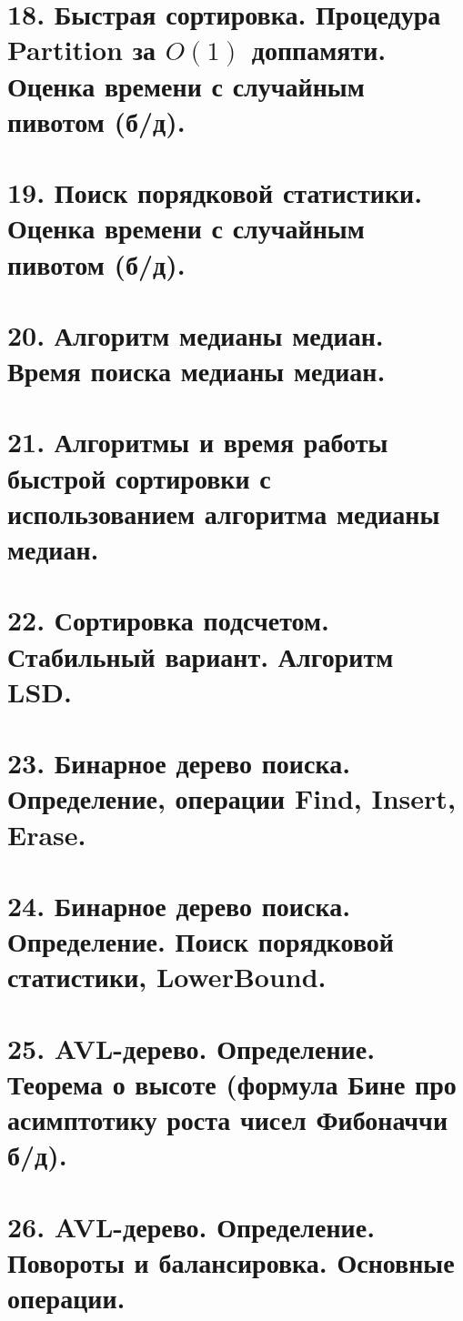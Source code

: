 \section{18. Быстрая сортировка. Процедура Partition за $O(1)$ доппамяти. Оценка времени с случайным
пивотом (б/д).}


\section{19. Поиск порядковой статистики. Оценка времени с случайным пивотом (б/д).}


\section{20. Алгоритм медианы медиан. Время поиска медианы медиан.}


\section{21. Алгоритмы и время работы быстрой сортировки с использованием алгоритма медианы медиан.}


\section{22. Сортировка подсчетом. Стабильный вариант. Алгоритм LSD.}


\section{23. Бинарное дерево поиска. Определение, операции Find, Insert, Erase.}


\section{24. Бинарное дерево поиска. Определение. Поиск порядковой статистики, LowerBound.}


\section{25. AVL-дерево. Определение. Теорема о высоте (формула Бине про асимптотику роста чисел Фибоначчи б/д).}


\section{26. AVL-дерево. Определение. Повороты и балансировка. Основные операции.}


